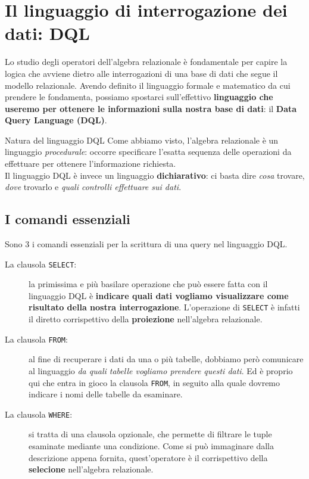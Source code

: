\documentclass[12pt]{report}
\begin{document}
	\section{Il linguaggio di interrogazione dei dati: DQL}
	Lo studio degli operatori dell'algebra relazionale è fondamentale per capire la logica che avviene dietro alle interrogazioni di una base di dati che segue il modello relazionale. Avendo definito il linguaggio formale e matematico da cui prendere le fondamenta, possiamo spostarci sull'effettivo \textbf{linguaggio che useremo per ottenere le informazioni sulla nostra base di dati}: il \textbf{Data Query Language (DQL)}.\\
	\begin{osservazione}{Natura del linguaggio DQL}{}
		Come abbiamo visto, l'algebra relazionale è un linguaggio \textit{procedurale}: occorre specificare l'esatta sequenza delle operazioni da effettuare per ottenere l'informazione richiesta.\\
		Il linguaggio DQL è invece un linguaggio \textbf{dichiarativo}: ci basta dire \textit{cosa} trovare, \textit{dove} trovarlo e \textit{quali controlli effettuare sui dati}.
	\end{osservazione}
	
	\subsection{I comandi essenziali}
	Sono 3 i comandi essenziali per la scrittura di una query nel linguaggio DQL.
	\begin{description}
		\item [La clausola \texttt{SELECT}:] la primissima e più basilare operazione che può essere fatta con il linguaggio DQL è \textbf{indicare quali dati vogliamo visualizzare come risultato della nostra interrogazione}. L'operazione di \texttt{SELECT} è infatti il diretto corrispettivo della \textbf{proiezione} nell'algebra relazionale.
		
		\item[La clausola \texttt{FROM}:] al fine di recuperare i dati da una o più tabelle, dobbiamo però comunicare al linguaggio \textit{da quali tabelle vogliamo prendere questi dati}. Ed è proprio qui che entra in gioco la clausola \texttt{FROM}, in seguito alla quale dovremo indicare i nomi delle tabelle da esaminare.
		
		\item[La clausola \texttt{WHERE}:] si tratta di una clausola opzionale, che permette di filtrare le tuple esaminate mediante una condizione. Come si può immaginare dalla descrizione appena fornita, quest'operatore è il corrispettivo della \textbf{selecione} nell'algebra relazionale.
	\end{description}
	
\end{document}
